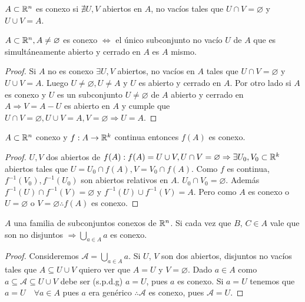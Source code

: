 \begin{definition}[Conexo]
  \(A \subset \mathbb{R}^n\) es conexo si \(\nexists U, V\) abiertos en \(A\), no vacíos tales que \(U \cap V = \varnothing \) y \(U \cup V = A\).
\end{definition}

\begin{prop}
  \(A \subset \mathbb{R}^n, A \neq \varnothing \) es conexo \(\iff \) el único subconjunto no vacío \(U\) de \(A\) que es simultáneamente abierto y cerrado en \(A\) es \(A\) mismo.
  \begin{proof}
    Si \(A\) no es conexo \(\exists U, V\) abiertos, no vacíos en \(A\) tales que \(U \cap V = \varnothing \) y \(U \cup V = A\). Luego \(U \neq \varnothing, U \neq A\) y \(U\) es abierto y cerrado en \(A\). Por otro lado si \(A\) es conexo y \(U\) es un subconjunto \(U \neq\varnothing \) de \(A\) abierto y cerrado en \(A \Rightarrow V = A - U\) es abierto en \(A\) y cumple que \(U \cap V = \varnothing, U \cup V = A, V = \varnothing \Rightarrow U = A\).
  \end{proof}
\end{prop}

\begin{theorem}
  \(A \subset \mathbb{R}^n\) conexo y \(f: A \to \mathbb{R}^k\) continua entonces \(f(A)\) es conexo.
  \begin{proof}
    \(U, V\) dos abiertos de \(f(A) : f(A) = U \cup V, U \cap V = \varnothing \Rightarrow \exists U_0, V_0 \subset \mathbb{R}^k\) abiertos tales que \(U = U_0 \cap f(A), V = V_0 \cap f(A)\). Como \(f\) es continua, \(f^{-1}(V_0), f^{-1}(U_0)\) son abiertos relativos en \(A\). \(U_0 \cap V_0 = \varnothing \). Además \(f^{-1}(U) \cap f^{-1}(V) =\varnothing \) y \(f^{-1}(U) \cup f^{-1}(V) = A\). Pero como \(A\) es conexo o \(U = \varnothing \) o \(V = \varnothing \therefore f(A)\) es conexo.
  \end{proof}
\end{theorem}

\begin{prop}
  \(A\) una familia de subconjuntos conexos de \(\mathbb{R}^n\). Si cada vez que \(B\text{, } C \in A\) vale que son no disjuntos \(\Rightarrow \bigcup_{a \in A} a\) es conexo.
  \begin{proof}
    Consideremos \( \mathcal{A} = \bigcup_{a \in A} a \).
    Si \( U\text{, } V \) son dos abiertos, disjuntos no vacíos tales que \( A \subseteq U \cup V \) quiero ver que \( A = U \) y \( V = \varnothing \).
    Dado \(a \in A\) como \( a \subseteq \mathcal{A} \subseteq U \cup V \) debe ser (s.p.d.g) \( a = U \), pues \( a \) es conexo. 
    Si \( a = U \) tenemos que \( a = U \quad \forall a \in A \) pues \( a \) era genérico \( \therefore \mathcal{A} \) es conexo, pues \( \mathcal{A} = U \).
  \end{proof}
\end{prop}
